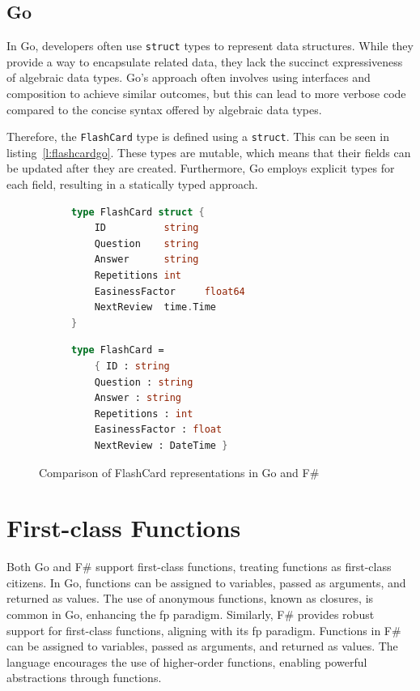     \subsection*{Go}
    In Go, developers often use \texttt{struct} types to represent data structures. While they provide a way to encapsulate related data, they lack the succinct expressiveness of algebraic data types. Go's approach often involves using interfaces and composition to achieve similar outcomes, but this can lead to more verbose code compared to the concise syntax offered by algebraic data types.

    Therefore, the \texttt{FlashCard} type is defined using a \texttt{struct}. This can be seen in listing\ \ref{l:flashcardgo}. These types are mutable, which means that their fields can be updated after they are created. Furthermore, Go employs explicit types for each field, resulting in a statically typed approach.

\begin{figure}[ht]
\begin{subfigure}{0.48\textwidth}
\begin{lstlisting}[language=go, firstnumber=1, caption={FlashCard representation in Go}, label=l:flashcardgo]
type FlashCard struct {
    ID          string
    Question    string
    Answer      string
    Repetitions int
    EasinessFactor     float64
    NextReview  time.Time
}
\end{lstlisting}
\end{subfigure}\hfill
\begin{subfigure}{0.48\textwidth}
\begin{lstlisting}[language=FSharp, firstnumber=1, caption={FlashCard representation in F\#}, label=l:flashcardfsharp]
type FlashCard =
    { ID : string
    Question : string
    Answer : string
    Repetitions : int
    EasinessFactor : float
    NextReview : DateTime }
\end{lstlisting}
\end{subfigure}
\caption{Comparison of FlashCard representations in Go and F\#}\label{fig:flashcardcomparison}
\end{figure}

    \section{First-class Functions}\label{sec:first-class-functions}
    Both Go and F\# support first-class functions, treating functions as first-class citizens. In Go, functions can be assigned to variables, passed as arguments, and returned as values. The use of anonymous functions, known as closures, is common in Go, enhancing the \ac{fp} paradigm. Similarly, F\# provides robust support for first-class functions, aligning with its \ac{fp} paradigm. Functions in F\# can be assigned to variables, passed as arguments, and returned as values. The language encourages the use of higher-order functions, enabling powerful abstractions through functions.

